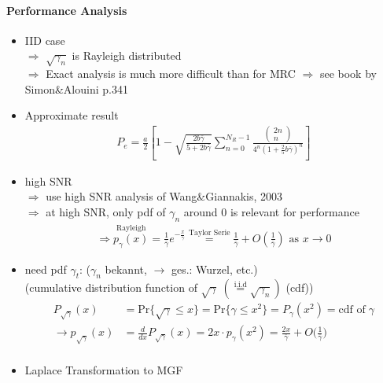 \documentclass[a4paper, 10pt]{article}
\begin{document}
\paragraph{Performance Analysis}
\begin{itemize}
	\item IID case \\
	$\Rightarrow$ $\sqrt{\gamma_n}$ is Rayleigh distributed\\
	$\Rightarrow$ Exact analysis is much more difficult than for MRC $\Rightarrow$ see book by Simon\;\&\;Alouini p.341
	\item Approximate result
\begin{align*}
	P_e=\frac{a}{2}\left[1-\sqrt{\frac{2b\bar{\gamma}}{5+2b\bar{\gamma}}}\sum\limits_{n=0}^{N_R-1}\frac{\left(\! \begin{array}{c} 2n \\ n \end{array} \!\right) }{4^n(1+\frac{2}{5}b\bar{\gamma})^n}\right]
\end{align*}
	\item high SNR\\
	$\Rightarrow$ use high SNR analysis of Wang\;\&\;Giannakis, 2003\\
	$\Rightarrow$ at high SNR, only pdf of $\gamma_n$ around $0$ is relevant for performance
\begin{align*}
	\Rightarrow \overset{\text{Rayleigh}}{p_\gamma(x)} = \frac{1}{\bar{\gamma}}e^{-\frac{x}{\bar{\gamma}}}\overset{\text{Taylor Serie}}{=}\frac{1}{\bar{\gamma}}+O\left(\frac{1}{\bar{\gamma}}\right)\text{ as } x \to 0
\end{align*}
	\item need pdf $\gamma _t$: ($\gamma _n$ bekannt, $\rightarrow$ ges.: Wurzel, etc.)\\ (cumulative distribution function of $\sqrt{\gamma}\;(\overset{\text{i.i.d}}{=}\sqrt{\gamma_n}) $ (cdf))
	\begin{align*}
		P_{\sqrt{\gamma}}(x) &= \text{Pr}\bigl\{\sqrt{\gamma}\leq x \bigr\} = \text{Pr}\bigl\{\gamma\leq x^2 \bigr\} = P_{\gamma}(x^2) = \text{cdf of}\;\gamma\\
		\rightarrow p_{\sqrt{\gamma}}(x) &= \frac{d}{dx}P_{\sqrt{\gamma}}(x) = 2x\cdot p_{\gamma}(x^2) = \frac{2x}{\bar{\gamma}} + O\bigl(\frac{1}{\bar{\gamma}}\bigr)\\
	\end{align*}
	\item Laplace Transformation to MGF
	\begin{align*}

\end{align*}
\end{itemize}
\end{document}
